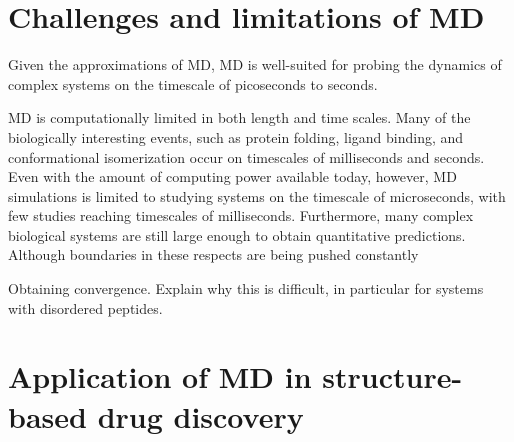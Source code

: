 

\section{Challenges and limitations of MD}

Given the approximations of MD, MD is well-suited for probing the dynamics of complex systems on the timescale of picoseconds to seconds.

MD is computationally limited in both length and time scales. Many of the biologically interesting events, such as protein folding, ligand binding, and conformational isomerization occur on timescales of milliseconds and seconds.  Even with the amount of computing power available today, however, MD simulations is limited to studying systems on the timescale of microseconds, with few studies reaching timescales of milliseconds. Furthermore, many complex biological systems are still large enough to obtain quantitative predictions. Although boundaries in these respects are being pushed constantly\cite{DE Shaw, Chris Neale, Sarah}

Obtaining convergence. Explain why this is difficult, in particular for systems with disordered peptides.			

\section{Application of MD in structure-based drug discovery}

